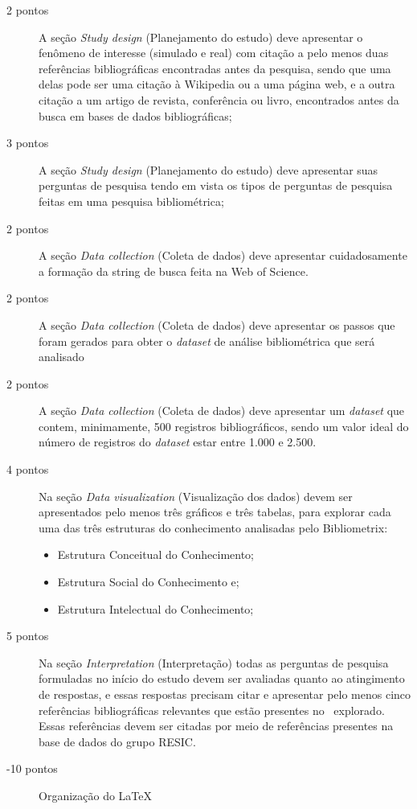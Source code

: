 \begin{description}
    \item [2 pontos] A seção \textit{Study design} (Planejamento do estudo) deve apresentar o fenômeno de interesse (simulado e real) com citação a pelo menos duas referências bibliográficas encontradas antes da pesquisa, sendo que uma delas pode ser uma citação à Wikipedia ou a uma página web, e a outra citação a um artigo de revista, conferência ou livro, encontrados antes da busca em bases de dados bibliográficas;
    \item [3 pontos] A seção \textit{Study design} (Planejamento do estudo) deve apresentar suas perguntas de pesquisa tendo em vista os tipos de perguntas de pesquisa feitas em uma pesquisa bibliométrica;
    \item [2 pontos] A seção \textit{Data collection} (Coleta de dados) deve apresentar cuidadosamente a formação da string de busca feita na Web of Science.
    \item [2 pontos] A seção \textit{Data collection} (Coleta de dados) deve apresentar os passos que foram gerados para obter o \textit{dataset} de análise bibliométrica que será analisado
    \item [2 pontos] A seção \textit{Data collection} (Coleta de dados) deve apresentar um \textit{dataset} que  contem, minimamente, 500 registros bibliográficos, sendo um valor ideal do número de registros do \textit{dataset} estar entre 1.000 e 2.500.
    \item [4 pontos] Na seção \textit{Data visualization} (Visualização dos dados) devem ser apresentados pelo menos três gráficos e três tabelas, para explorar cada uma das três estruturas do conhecimento analisadas pelo Bibliometrix: 
    \begin{itemize}
        \item Estrutura Conceitual do Conhecimento;
        \item Estrutura Social  do Conhecimento e;
        \item Estrutura Intelectual do Conhecimento;
    \end{itemize}
    \item [5 pontos] Na seção   \textit{Interpretation} (Interpretação) todas as perguntas de pesquisa formuladas no início do estudo devem ser avaliadas quanto ao atingimento de respostas, e essas respostas precisam citar e apresentar pelo menos cinco referências bibliográficas relevantes  que estão presentes no \dataset\ explorado. Essas referências devem ser citadas por meio de referências presentes na base de dados do grupo RESIC.
    \item [-10 pontos] Organização do \LaTeX


\end{description}
